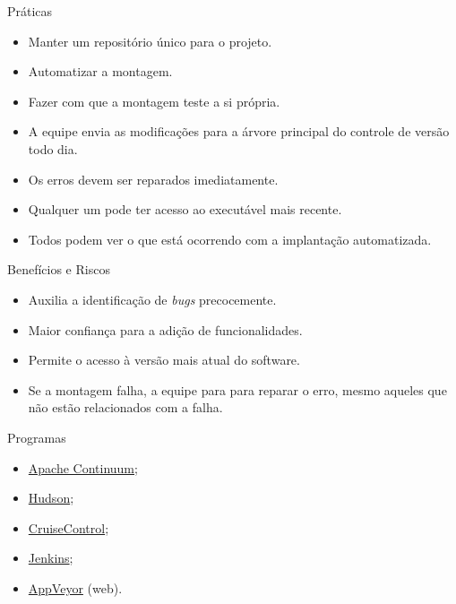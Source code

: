 \begin{frame}{\insertlecture}{Práticas}

  \begin{itemize}[<+->]
  \item Manter um repositório único para o projeto.
  \item Automatizar a montagem.
  \item Fazer com que a montagem teste a si própria.
  \item A equipe envia as modificações para a árvore principal 
    do controle de versão todo dia.
  \item Os erros devem ser reparados imediatamente.
  \item Qualquer um pode ter acesso ao executável mais recente.
  \item Todos podem ver o que está ocorrendo com a implantação 
    automatizada.
  \end{itemize}
  
\end{frame}

\begin{frame}{\insertlecture}{Benefícios e Riscos}

  \begin{description}[<+->]
  \item[Benefícios] 
    \begin{itemize}
    \item Auxilia a identificação de {\em bugs} precocemente.
    \item Maior confiança para a adição de funcionalidades.
    \item Permite o acesso à versão mais atual do software.
    \end{itemize}
  \item[Riscos] 
    \begin{itemize}
    \item Se a montagem falha, a equipe para para reparar o 
      erro, mesmo aqueles que não estão relacionados com a 
      falha.
    \end{itemize}
  \end{description}

\end{frame}

\begin{frame}{\insertlecture}{Programas}

  \begin{itemize}
  \item \href{https://continuum.apache.org/}{Apache Continuum};
  \item \href{http://hudson-ci.org/}{Hudson};
  \item \href{http://cruisecontrol.sourceforge.net/}{CruiseControl};
  \item \href{https://jenkins.io/}{Jenkins};
  \item \href{https://www.appveyor.com/}{AppVeyor} (web).
  \end{itemize}

\end{frame}

